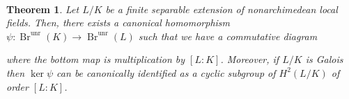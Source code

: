 \documentclass[11pt]{article}
\newcommand{\Q}{\mathbb{Q}}
\newcommand{\Z}{\mathbb{Z}}
\DeclareMathOperator{\Br}{Br} %
\DeclareMathOperator{\inv}{inv} %
\DeclareMathOperator{\unr}{unr} %
\newtheorem*{theorem*}{\\Theorem}
\begin{document}
\begin{theorem*}
Let $L/K$ be a finite separable extension of nonarchimedean local fields. Then, there exists a canonical homomorphism $\psi: \Br^{\unr}(K)\to\Br^{\unr}(L)$ such that we have a commutative diagram
\begin{center}
\end{center}
where the bottom map is multiplication by $[L:K]$. Moreover, if $L/K$ is Galois then $\ker\psi$ can be canonically identified as a cyclic subgroup of $H^2(L/K)$ of order $[L:K]$.
\end{theorem*}
\end{document}
